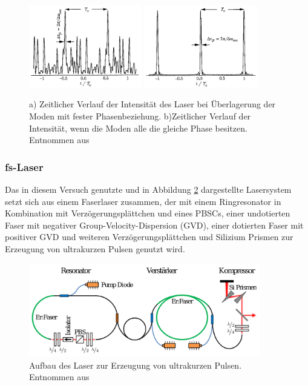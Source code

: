       \FloatBarrier
      \begin{figure}[h]
        \centering
        \includegraphics[width = 0.44\textwidth]{pictures/ML_phase_const.png}
        \includegraphics[width = 0.44\textwidth]{pictures/ML_phase_gleich.png}
        \caption{a) Zeitlicher Verlauf der Intensität des Laser bei Überlagerung der Moden mit fester Phasenbeziehung. b)Zeitlicher Verlauf der Intensität, wenn die Moden alle die gleiche Phase besitzen. Entnommen aus \cite{tu_dortmund_versuchsanleitung_nodate}}
        \label{fig:Modelocking}
      \end{figure}
      \FloatBarrier
      
    \newpage
    \subsubsection{fs-Laser}

      Das in diesem Versuch genutzte und in Abbildung \ref{fig:Laser} dargestellte Lasersystem setzt sich aus einem Faserlaser zusammen, der mit einem Ringresonator in Kombination mit Verzögerungsplättchen 
      und eines PBSCs, einer undotierten Faser mit negativer Group-Velocity-Dispersion (GVD), einer dotierten Faser mit positiver GVD und weiteren Verzögerungsplättchen und Silizium Prismen zur Erzeugung von
      ultrakurzen Pulsen genutzt wird. 

      \FloatBarrier
      \begin{figure}[h]
        \centering
        \includegraphics[width = 0.9\textwidth]{pictures/Laser.png}
        \caption{Aufbau des Laser zur Erzeugung von ultrakurzen Pulsen. Entnommen aus \cite{tu_dortmund_versuchsanleitung_nodate}}
        \label{fig:Laser}
      \end{figure}
      \FloatBarrier


